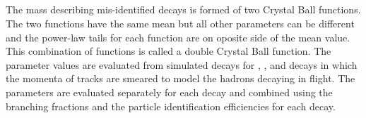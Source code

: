 \subsection{\bhh}%
The mass \pdf describing mis-identified \bhh decays is formed of two Crystal Ball functions. The two functions have the same mean but all other parameters can be different and the power-law tails for each function are on oposite side of the mean value. This combination of functions is called a double Crystal Ball function. The parameter values are evaluated from simulated decays for \bdkpi, \bskk, \bdpipi and \bskpi decays in which the momenta of tracks are smeared to model the hadrons decaying in flight. The parameters are evaluated separately for each decay and combined using the branching fractions and the particle identification efficiencies for each decay.

